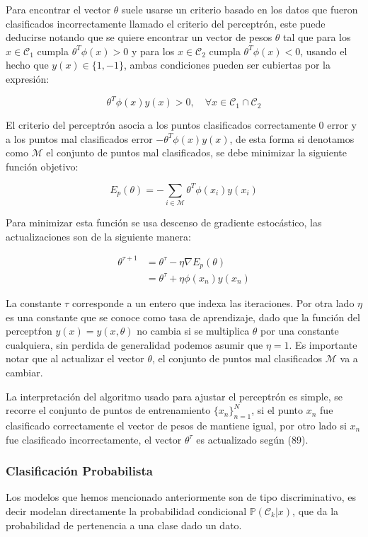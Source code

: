 Para encontrar el vector $\theta$ suele usarse un criterio basado en los datos que fueron clasificados incorrectamente llamado el criterio del perceptrón, este puede deducirse notando que se quiere encontrar un vector de pesos $\theta$ tal que para los $x\in\mathcal{C}_1$ cumpla $\theta^T\phi(x) > 0$ y para los $x\in\mathcal{C}_2$ cumpla $\theta^T\phi(x) < 0$, usando el hecho que $y(x)\in\{1,-1\}$, ambas condiciones pueden ser cubiertas por la expresión:

$$\theta^T\phi(x)y(x) > 0,\quad \forall x \in \mathcal{C}_1\cap\mathcal{C}_2$$

El criterio del perceptrón asocia a los puntos clasificados correctamente 0 error y a los puntos mal clasificados error $-\theta^T\phi(x)y(x)$, de esta forma si denotamos como $\mathcal{M}$ el conjunto de puntos mal clasificados, se debe minimizar la siguiente función objetivo:

$$ E_p(\theta) = -\sum_{i\in\mathcal{M}}\theta^T\phi(x_i)y(x_i) $$

Para minimizar esta función se usa descenso de gradiente estocástico, las actualizaciones son de la siguiente manera:

\begin{align}
	\theta^{\tau+1} &= \theta^\tau - \eta \nabla E_p(\theta)\\
	&= \theta^\tau + \eta \phi(x_n)y(x_n)
\end{align}

La constante $\tau$ corresponde a un entero que indexa las iteraciones. Por otra lado $\eta$ es una constante que se conoce como tasa de aprendizaje, dado que la función del perceptŕon $y(x)=y(x,\theta)$ no cambia si se multiplica $\theta$ por una constante cualquiera, sin perdida de generalidad podemos asumir que $\eta=1$. Es importante notar que al actualizar el vector $\theta$, el conjunto de puntos mal clasificados $\mathcal{M}$ va a cambiar.

La interpretación del algoritmo usado para ajustar el perceptrón es simple, se recorre el conjunto de puntos de entrenamiento $\{x_n\}_{n=1}^N$, si el punto $x_n$ fue clasificado correctamente el vector de pesos de mantiene igual, por otro lado si $x_n$ fue clasificado incorrectamente, el vector $\theta^\tau$ es actualizado según (89).
\newpage
\subsubsection{Clasificación Probabilista}

Los modelos que hemos mencionado anteriormente son de tipo discriminativo, es decir modelan directamente la probabilidad condicional $\mathbb{P}(\mathcal{C}_k|x)$, que da la probabilidad de pertenencia a una clase dado un dato.

